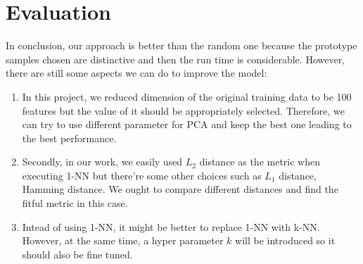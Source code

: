 \documentclass{article}
\begin{document}
\section{Evaluation}
In conclusion, our approach is better than the random one because the prototype samples chosen are distinctive and then the run time is considerable. However, there are still some aspects we can do to improve the model:
\begin{enumerate}[(1)]
\item In this project, we reduced dimension of the original training data to be 100 features but the value of it should be appropriately selected. Therefore, we can try to use different parameter for PCA and keep the best one leading to the best performance.
\item Secondly, in our work, we easily used $L_2$ distance as the metric when executing 1-NN but there're some other choices such as $L_1$ distance, Hamming distance. We ought to compare different distances and find the fitful metric in this case.
\item Intead of using 1-NN, it might be better to replace 1-NN with k-NN. However, at the same time, a hyper parameter $k$ will be introduced so it should also be fine tuned.
\end{enumerate}
\end{document}
